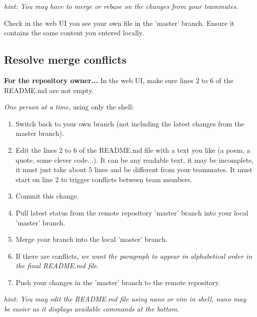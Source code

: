\textit{hint: You may have to merge or rebase on the changes from your teammates.}

Check in the web UI you see your own file in the 'master' branch.
Ensure it contains the same content you entered locally.




\subsection{Resolve merge conflicts}  %

\textbf{For the repository owner...} In the web UI, make sure lines 2 to 6 of the README.md are not empty.

\textit{One person at a time}, using only the shell:
\begin{enumerate}
    \item Switch back to your own branch (not including the latest changes from the master branch).
    \item Edit the lines 2 to 6 of the README.md file with a text you like (a poem, a quote, some clever code...).
          It can be any readable text, it may be incomplete, it must just take about 5 lines and be different from your teammates.
          It must start on line 2 to trigger conflicts between team members.
    \item Commit this change.
    \item Pull latest status from the remote repository 'master' branch into your local 'master' branch.
    \item Merge your branch into the local 'master' branch.
    \item If there are conflicts, \textit{we want the paragraph to appear in alphabetical order in the final README.md file.}
    \item Push your changes in the 'master' branch to the remote repository.
\end{enumerate}

\textit{hint: You may edit the README.md file using nano or vim in shell, nano may be easier as it displays available commands at the bottom.}

